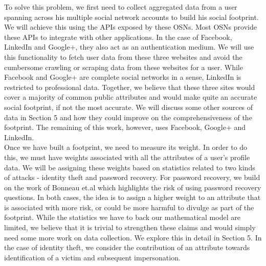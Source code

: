 \documentclass[10pt,conference]{IEEEtran}
\begin{document}
To solve this problem, we first need to collect aggregated data from a user spanning across his multiple social network accounts to build his social footprint. We will achieve this using the APIs exposed by these OSNs. Most OSNs provide these APIs to integrate with other applications. In the case of Facebook, LinkedIn and Google+, they also act as an authentication medium. We will use this functionality to fetch user data from these three websites and avoid the cumbersome crawling or scraping data from these websites for a user. While Facebook and Google+ are complete social networks in a sense, LinkedIn is restricted to professional data. Together, we believe that these three sites would cover a majority of common public attributes and would make quite an accurate social footprint, if not the most accurate. We will discuss some other sources of data in Section 5 and how they could improve on the comprehensiveness of the footprint. The remaining of this work, however, uses Facebook, Google+ and LinkedIn.\\

Once we have built a footprint, we need to measure its weight. In order to do this, we must have weights associated with all the attributes of a user's profile data. We will be assigning these weights based on statistics related to two kinds of attacks - identity theft and password recovery. For password recovery, we build on the work of Bonneau et.al \cite{google} which highlights the risk of using password recovery questions. In both cases, the idea is to assign a higher weight to an attribute that is associated with more risk, or could be more harmful to divulge as part of the footprint. While the statistics we have to back our mathematical model are limited, we believe that it is trivial to strengthen these claims and would simply need some more work on data collection. We explore this in detail in Section 5. In the case of identity theft, we consider the contribution of an attribute towards identification of a victim and subsequent impersonation.\\
\end{document}
